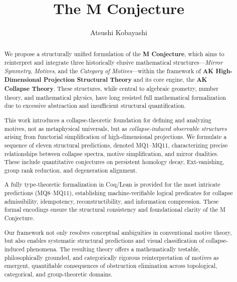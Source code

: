 \documentclass[11pt]{article}
\title{The M Conjecture}
\author{Atsushi Kobayashi}
\date{}
\begin{document}
\maketitle




\begin{abstract}
We propose a structurally unified formulation of the \textbf{M Conjecture}, which aims to reinterpret and integrate three historically elusive mathematical structures---\emph{Mirror Symmetry}, \emph{Motives}, and the \emph{Category of Motives}---within the framework of \textbf{AK High-Dimensional Projection Structural Theory} and its core engine, the \textbf{AK Collapse Theory}. These structures, while central to algebraic geometry, number theory, and mathematical physics, have long resisted full mathematical formalization due to excessive abstraction and insufficient structural quantification.

This work introduces a collapse-theoretic foundation for defining and analyzing motives, not as metaphysical universals, but as \emph{collapse-induced observable structures} arising from functorial simplification of high-dimensional projections. We formulate a sequence of eleven structural predictions, denoted MQ1--MQ11, characterizing precise relationships between collapse spectra, motive simplification, and mirror dualities. These include quantitative conjectures on persistent homology decay, Ext-vanishing, group rank reduction, and degeneration alignment.

A fully type-theoretic formalization in Coq/Lean is provided for the most intricate predictions (MQ8--MQ11), establishing machine-verifiable logical predicates for collapse admissibility, idempotency, reconstructibility, and information compression. These formal encodings ensure the structural consistency and foundational clarity of the M Conjecture.

Our framework not only resolves conceptual ambiguities in conventional motive theory, but also enables systematic structural predictions and visual classification of collapse-induced phenomena. The resulting theory offers a mathematically testable, philosophically grounded, and categorically rigorous reinterpretation of motives as emergent, quantifiable consequences of obstruction elimination across topological, categorical, and group-theoretic domains.
\end{abstract}
\end{document}
